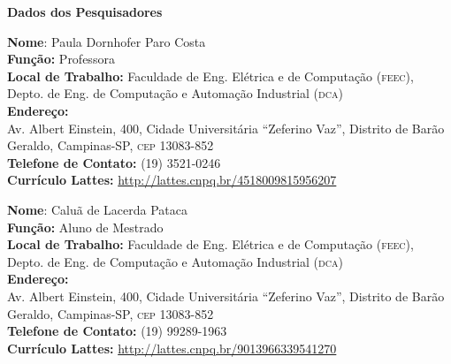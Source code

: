 \documentclass[a4paper,11pt,titlepage,singlespacing]{article}
\begin{document}

\begin{titlepage}
\begin{center}
\Large{\textbf{Dados dos Pesquisadores}}\\
\end{center}

\vspace{10pt}
\begin{flushleft}
\large{\textbf{Nome}: Paula Dornhofer Paro Costa}\\
\large{\textbf{Função:} Professora}\\
\large{\textbf{Local de Trabalho:} Faculdade de Eng. Elétrica e de Computação (\textsc{feec}), Depto. de Eng. de Computação e Automação Industrial (\textsc{dca})}\\
\large{\textbf{Endereço:} \\Av. Albert Einstein, 400, Cidade Universitária ``Zeferino Vaz'', Distrito de Barão Geraldo, Campinas-SP, \textsc{cep} 13083-852}\\
\large{\textbf{Telefone de Contato:} (19) 3521-0246 }\\
\large{\textbf{Currículo Lattes:} \url{http://lattes.cnpq.br/4518009815956207} }\\
\end{flushleft}

\vspace{10pt}

\begin{flushleft}
\large{\textbf{Nome}: Caluã de Lacerda Pataca }\\
\large{\textbf{Função:} Aluno de Mestrado}\\
\large{\textbf{Local de Trabalho:} Faculdade de Eng. Elétrica e de Computação (\textsc{feec}), Depto. de Eng. de Computação e Automação Industrial (\textsc{dca})}\\
\large{\textbf{Endereço:} \\Av. Albert Einstein, 400, Cidade Universitária ``Zeferino Vaz'', Distrito de Barão Geraldo, Campinas-SP, \textsc{cep} 13083-852}\\
\large{\textbf{Telefone de Contato:} (19) 99289-1963 }\\
\large{\textbf{Currículo Lattes:} \url{http://lattes.cnpq.br/9013966339541270} }\\
\end{flushleft}
\vspace{10pt}

\vspace{10pt}

\end{titlepage}
\end{document}
